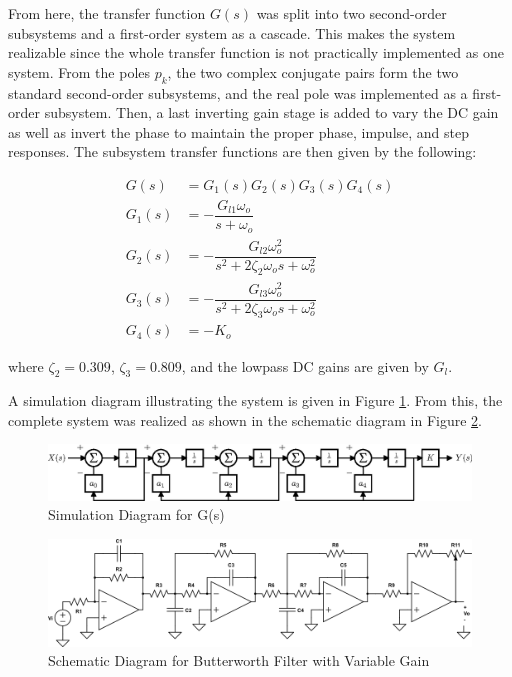 From here, the transfer function $G(s)$ was split into two second-order subsystems and a first-order system as a cascade\cite{tfnotes}. This makes the system realizable since the whole transfer function is not practically implemented as one system. From the poles $p_k$, the two complex conjugate pairs form the two standard second-order subsystems, and the real pole was implemented as a first-order subsystem. Then, a last inverting gain stage is added to vary the DC gain as well as
invert the phase to maintain the proper phase, impulse, and step responses. The subsystem transfer functions are then given by the following:

\begin{align*}
G(s) &= G_1(s)G_2(s)G_3(s)G_4(s)\\
G_1(s) &= -\dfrac{G_{l1}\omega_o}{s+\omega_o}\\
G_2(s) &= -\dfrac{G_{l2}\omega_o^2}{s^2+2\zeta_2 \omega_o s + \omega_o^2}\\
G_3(s) &= -\dfrac{G_{l3}\omega_o^2}{s^2+2\zeta_3 \omega_o s + \omega_o^2}\\
G_4(s) &= -K_o
\end{align*}

where $\zeta_2=0.309$, $\zeta_3=0.809$, and the lowpass DC gains are given by $G_l$. 

A simulation diagram illustrating the system is given in Figure \ref{fig:sim}. From this, the complete system was realized as shown in the schematic diagram in Figure \ref{fig:ckt}. 

\begin{figure}[H]
\centering
\includegraphics[width=\textwidth]{fig/simdiag}
\caption{Simulation Diagram for G(s)\label{fig:sim}}
\end{figure}

\begin{figure}[H]
\centering
\includegraphics[width=\textwidth]{fig/ckt.png}
\caption{Schematic Diagram for Butterworth Filter with Variable Gain\label{fig:ckt}}
\end{figure}

